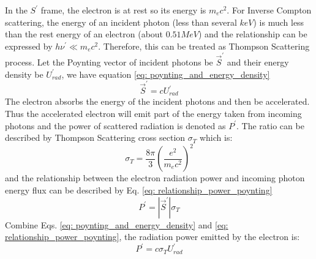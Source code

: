 \documentclass[12pt]{report}
\begin{document}
            In the $S^{\prime}$ frame, the electron is at rest so its energy is $m_e c^2$. 
            For Inverse Compton scattering, the energy of an incident photon 
            (less than several $keV$) is much less than the rest energy of an electron 
            (about $0.51MeV$) and the relationship can be expressed by 
            $h\nu^{\prime} \ll m_e c^2$. Therefore, this can be treated as Thompson 
            Scattering process. Let the Poynting vector of incident photons be 
            $\vec{S}^{\prime}$ and their energy density be $U_{rad}^{\prime}$, we have 
            equation \ref{eq: poynting_and_energy_density}
            \begin{equation}
              \label{eq: poynting_and_energy_density}
              \vec{S}^{\prime} = c U_{rad}^{\prime}
            \end{equation}
            The electron absorbs the energy of the incident photons and then be accelerated. 
            Thus the accelerated electron will emit part of the energy taken from incoming 
            photons and the power of scattered radiation is denoted as $P^{\prime}$.
            The ratio can be described by Thompson Scattering cross section $\sigma_{T}$ 
            which is:
            \begin{equation}
              \label{eq: thompson_cross_section}
              \sigma_{T} = \frac{8\pi}{3} \left(\frac{e^2}{m_e c^2}\right)^2
            \end{equation}
            and the relationship between the electron radiation power and incoming photon 
            energy flux can be described by Eq. \ref{eq: relationship_power_poynting}
            \begin{equation}
              \label{eq: relationship_power_poynting}
              P^{\prime} = \left| \vec{S}^{\prime} \right| \sigma_{T}
            \end{equation}
            Combine Eqs. \ref{eq: poynting_and_energy_density} and 
            \ref{eq: relationship_power_poynting}, the radiation power emitted by the 
            electron is: 
            \begin{equation}
              \label{eq: final_relationship}
              P^{\prime} = c \sigma_{T} U^{\prime}_{rad}
            \end{equation}
\end{document}
